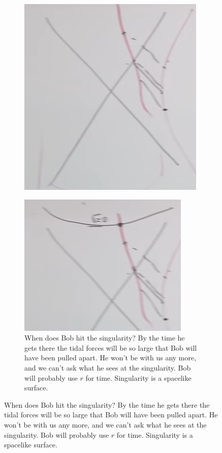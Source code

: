 \documentclass[]{article}
\begin{document}
{\begin{figure}[H]
\begin{subfigure}[t]{0.3\textwidth}
		\includegraphics[width=\textwidth]{gr-6-bobs-perspective}
	\end{subfigure}
	\begin{subfigure}[t]{0.3\textwidth}
		\caption{When does Bob hit the singularity? By the time he gets there the tidal forces will be so large that Bob will have been pulled apart. He won't be with us any more, and we can't ask what he sees at the singularity. Bob will probably use $r$ for time. Singularity is a spacelike surface.}\label{fig:gr-6-bob-singularity}
		\includegraphics[width=\textwidth]{gr-6-bob-singularity}
	\end{subfigure}
\end{figure}

}
\end{document}
